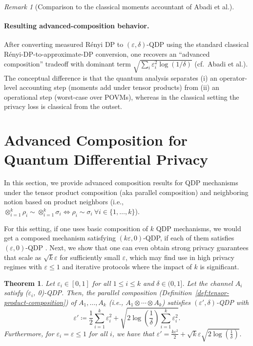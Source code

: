 \documentclass[11pt]{article}
\theoremstyle{plain}
\newtheorem{theorem}[theo]{Theorem}
\theoremstyle{remark}
\newtheorem{remark}[theo]{Remark}
\begin{document}
\begin{remark}[Comparison to the classical moments accountant of Abadi et al.]
\paragraph{Resulting advanced-composition behavior.}
After converting measured R\'enyi DP to $(\varepsilon,\delta)$-QDP using the standard classical
R\'enyi-DP-to-approximate-DP conversion, one recovers an ``advanced composition'' tradeoff with
dominant term $\sqrt{\sum_i \varepsilon_i^2\log(1/\delta)}$ (cf.\ Abadi et al.).
The conceptual difference is that the quantum analysis separates (i) an operator-level accounting
step (moments add under tensor products) from (ii) an operational step (worst-case over POVMs),
whereas in the classical setting the privacy loss is classical from the outset.
\end{remark}


\section{Advanced Composition for Quantum Differential Privacy}
\label{sec:tensor-product-advanced}



In this section, we provide advanced composition results for QDP mechanisms under the tensor product composition (aka parallel composition) and neighboring notion based on product neighbors (i.e., $\otimes_{i=1}^k \rho_i \sim \otimes_{i=1}^k \sigma_i \iff \rho_i \sim \sigma_i \ \forall i \in \{1,\ldots, k\}$). 

For this setting, if one uses basic composition of $k$ QDP mechanisms, we would get a composed mechanism satisfying $(k\varepsilon, 0)$-QDP, if each of them satisfies $(\varepsilon, 0)$-QDP \cite{QDP_computation17, hirche2022quantum}. Next, we show that one can even obtain strong privacy guarantees that scale as $\sqrt{k} \varepsilon$ for sufficiently small $\varepsilon$, which may find use in high privacy regimes with $\varepsilon \leq 1$ and iterative protocols where the impact of $k$ is significant.

\begin{theorem}
Let $\varepsilon_i \in [0,1]$     for all $1\leq i \leq k$ and $\delta \in (0,1]$. Let the channel $A_i$ satisfy ($\varepsilon_i$, 0)-QDP. Then, the parallel composition (Definition~\ref{def:tensor-product-composition}) of
$A_1, \ldots, A_k$ (i.e., $A_1 \otimes \cdots \otimes A_k$) satisfies $(\varepsilon', \delta)$-QDP with
\begin{equation}
  \varepsilon' \coloneqq \frac{1}{2} \sum_{i=1}^k {\varepsilon_i^2} + \sqrt{2 \log\!\left( \frac{1}{\delta} \right) \sum_{i=1}^k {\varepsilon_i^2} }.
\end{equation}
Furthermore, for $\varepsilon_i=\varepsilon \leq 1$ for all $i$, we have that 
$
    \varepsilon' = \frac{ k \varepsilon^2}{2} + \sqrt{k} \varepsilon \sqrt{2 \log\!\left( \frac{1}{\delta} \right)}.
$
\label{thm:tensor-product-advanced}
\end{theorem}
\end{document}
